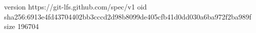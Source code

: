 version https://git-lfs.github.com/spec/v1
oid sha256:6913e4fd43704402bb3cccd2d98b8099de405cfb41d0dd030a6ba972f2ba989f
size 196704
